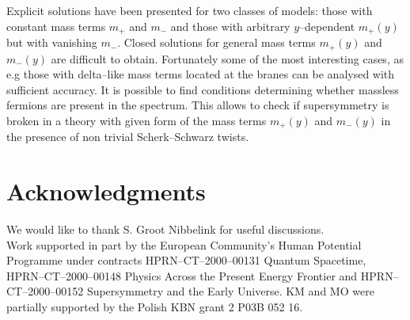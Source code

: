 \documentclass[a4paper,12pt]{article}
\begin{document}
Explicit solutions have been presented for two classes of models:
those with constant mass terms $m_+$ and $m_-$ and those with
arbitrary $y$--dependent $m_+(y)$ but with vanishing $m_-$. 
Closed solutions for general mass terms $m_+(y)$ and $m_-(y)$ are
difficult to obtain. Fortunately some of the most interesting cases,
as e.g those with delta--like mass terms located at the branes can be
analysed with sufficient accuracy. It is possible to find conditions
determining whether massless fermions are present in the
spectrum. This allows to check if supersymmetry is broken in a theory
with given form of the mass terms $m_+(y)$ and $m_-(y)$ in the
presence of non trivial Scherk--Schwarz twists. 




\section*{Acknowledgments}

We would like to thank S. Groot Nibbelink for useful discussions. 
\\ 
Work supported in part by the European Community's Human Potential
Programme under contracts HPRN--CT--2000--00131 Quantum Spacetime,
HPRN--CT--2000--00148 Physics Across the Present Energy Frontier
and HPRN--CT--2000--00152 Supersymmetry and the Early Universe.
KM and MO were partially supported by the Polish KBN grant 
2 P03B 052 16. 
\end{document}
